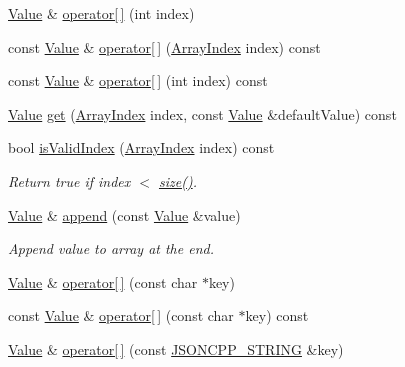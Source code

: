 \begin{DoxyCompactItemize}
\item 
\hyperlink{class_json_1_1_value}{Value} \& \hyperlink{class_json_1_1_value_ac9182982c361e0ab621134d406e5f250}{operator\mbox{[}$\,$\mbox{]}} (int index)
\item 
const \hyperlink{class_json_1_1_value}{Value} \& \hyperlink{class_json_1_1_value_a46607236038b29695ed80c15895271e4}{operator\mbox{[}$\,$\mbox{]}} (\hyperlink{class_json_1_1_value_a184a91566cccca7b819240f0d5561c7d}{Array\+Index} index) const
\item 
const \hyperlink{class_json_1_1_value}{Value} \& \hyperlink{class_json_1_1_value_a0b42557a95621a4676b46a21ffc5e949}{operator\mbox{[}$\,$\mbox{]}} (int index) const
\item 
\hyperlink{class_json_1_1_value}{Value} \hyperlink{class_json_1_1_value_a034eb7bf85a44fa759bdaa232788ca66}{get} (\hyperlink{class_json_1_1_value_a184a91566cccca7b819240f0d5561c7d}{Array\+Index} index, const \hyperlink{class_json_1_1_value}{Value} \&default\+Value) const
\item 
bool \hyperlink{class_json_1_1_value_ac2928f174a6e081c1500c28c2d61ee93}{is\+Valid\+Index} (\hyperlink{class_json_1_1_value_a184a91566cccca7b819240f0d5561c7d}{Array\+Index} index) const
\begin{DoxyCompactList}\small\item\em Return true if index $<$ \hyperlink{class_json_1_1_value_a0ec2808e1d7efa4e9fad938d6667be44}{size()}. \end{DoxyCompactList}\item 
\hyperlink{class_json_1_1_value}{Value} \& \hyperlink{class_json_1_1_value_a7e49ac977e4bcf59745a09d426669f75}{append} (const \hyperlink{class_json_1_1_value}{Value} \&value)
\begin{DoxyCompactList}\small\item\em Append value to array at the end. \end{DoxyCompactList}\item 
\hyperlink{class_json_1_1_value}{Value} \& \hyperlink{class_json_1_1_value_acb912f4ec40a25ea6eb387730885f3d9}{operator\mbox{[}$\,$\mbox{]}} (const char $\ast$key)
\item 
const \hyperlink{class_json_1_1_value}{Value} \& \hyperlink{class_json_1_1_value_a1b0498b7b2a520a68137f682d91abdd5}{operator\mbox{[}$\,$\mbox{]}} (const char $\ast$key) const
\item 
\hyperlink{class_json_1_1_value}{Value} \& \hyperlink{class_json_1_1_value_aedd1e152756a4cc8c1ebac0dd7aeeb78}{operator\mbox{[}$\,$\mbox{]}} (const \hyperlink{json_8h_a1e723f95759de062585bc4a8fd3fa4be}{J\+S\+O\+N\+C\+P\+P\+\_\+\+S\+T\+R\+I\+NG} \&key)

\end{DoxyCompactItemize}
